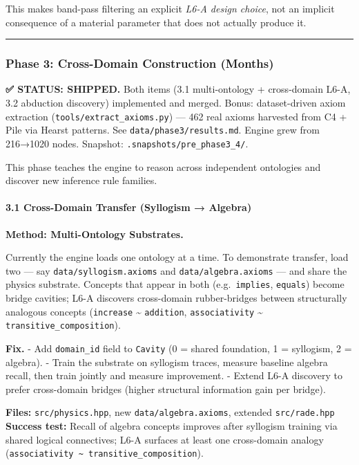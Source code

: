 \documentclass[
  11pt,
  a4paper,
]{article}
\begin{document}
This makes band-pass filtering an explicit \emph{L6-A design choice},
not an implicit consequence of a material parameter that does not
actually produce it.

\begin{center}\rule{0.5\linewidth}{0.5pt}\end{center}

\subsubsection{Phase 3: Cross-Domain Construction
(Months)}\label{phase-3-cross-domain-construction-months}

\textbf{✅ STATUS: SHIPPED.} Both items (3.1 multi-ontology +
cross-domain L6-A, 3.2 abduction discovery) implemented and merged.
Bonus: dataset-driven axiom extraction
(\texttt{tools/extract\_axioms.py}) --- 462 real axioms harvested from
C4 + Pile via Hearst patterns. See \texttt{data/phase3/results.md}.
Engine grew from 216→1020 nodes. Snapshot:
\texttt{.snapshots/pre\_phase3\_4/}.

This phase teaches the engine to reason across independent ontologies
and discover new inference rule families.

\paragraph{3.1 Cross-Domain Transfer (Syllogism →
Algebra)}\label{cross-domain-transfer-syllogism-algebra}

\textbf{Method: Multi-Ontology Substrates.}

Currently the engine loads one ontology at a time. To demonstrate
transfer, load two --- say \texttt{data/syllogism.axioms} and
\texttt{data/algebra.axioms} --- and share the physics substrate.
Concepts that appear in both (e.g.~\texttt{implies}, \texttt{equals})
become bridge cavities; L6-A discovers cross-domain rubber-bridges
between structurally analogous concepts (\texttt{increase}
\textasciitilde{} \texttt{addition}, \texttt{associativity}
\textasciitilde{} \texttt{transitive\_composition}).

\textbf{Fix.} - Add \texttt{domain\_id} field to \texttt{Cavity} (0 =
shared foundation, 1 = syllogism, 2 = algebra). - Train the substrate on
syllogism traces, measure baseline algebra recall, then train jointly
and measure improvement. - Extend L6-A discovery to prefer cross-domain
bridges (higher structural information gain per bridge).

\textbf{Files:} \texttt{src/physics.hpp}, new
\texttt{data/algebra.axioms}, extended \texttt{src/rade.hpp}
\textbf{Success test:} Recall of algebra concepts improves after
syllogism training via shared logical connectives; L6-A surfaces at
least one cross-domain analogy
(\texttt{associativity\ \textasciitilde{}\ transitive\_composition}).
\end{document}
